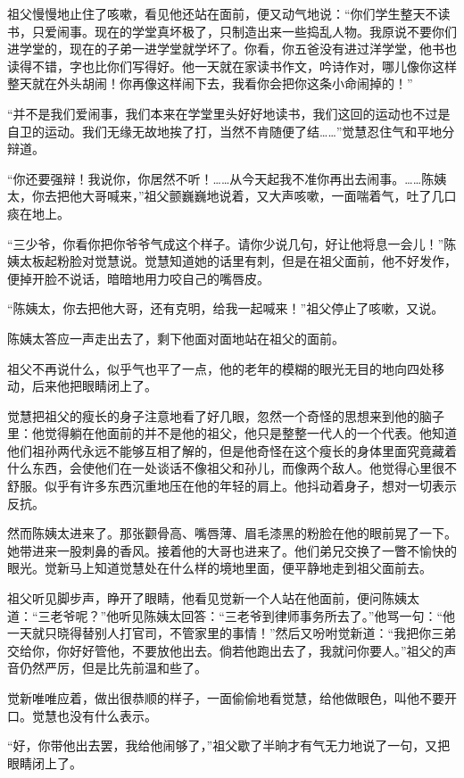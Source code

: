 \par 祖父慢慢地止住了咳嗽，看见他还站在面前，便又动气地说：“你们学生整天不读书，只爱闹事。现在的学堂真坏极了，只制造出来一些捣乱人物。我原说不要你们进学堂的，现在的子弟一进学堂就学坏了。你看，你五爸没有进过洋学堂，他书也读得不错，字也比你们写得好。他一天就在家读书作文，吟诗作对，哪儿像你这样整天就在外头胡闹！你再像这样闹下去，我看你会把你这条小命闹掉的！”
\par “并不是我们爱闹事，我们本来在学堂里头好好地读书，我们这回的运动也不过是自卫的运动。我们无缘无故地挨了打，当然不肯随便了结……”觉慧忍住气和平地分辩道。
\par “你还要强辩！我说你，你居然不听！……从今天起我不准你再出去闹事。……陈姨太，你去把他大哥喊来，”祖父颤巍巍地说着，又大声咳嗽，一面喘着气，吐了几口痰在地上。
\par “三少爷，你看你把你爷爷气成这个样子。请你少说几句，好让他将息一会儿！”陈姨太板起粉脸对觉慧说。觉慧知道她的话里有刺，但是在祖父面前，他不好发作，便掉开脸不说话，暗暗地用力咬自己的嘴唇皮。
\par “陈姨太，你去把他大哥，还有克明，给我一起喊来！”祖父停止了咳嗽，又说。
\par 陈姨太答应一声走出去了，剩下他面对面地站在祖父的面前。
\par 祖父不再说什么，似乎气也平了一点，他的老年的模糊的眼光无目的地向四处移动，后来他把眼睛闭上了。
\par 觉慧把祖父的瘦长的身子注意地看了好几眼，忽然一个奇怪的思想来到他的脑子里：他觉得躺在他面前的并不是他的祖父，他只是整整一代人的一个代表。他知道他们祖孙两代永远不能够互相了解的，但是他奇怪在这个瘦长的身体里面究竟藏着什么东西，会使他们在一处谈话不像祖父和孙儿，而像两个敌人。他觉得心里很不舒服。似乎有许多东西沉重地压在他的年轻的肩上。他抖动着身子，想对一切表示反抗。
\par 然而陈姨太进来了。那张颧骨高、嘴唇薄、眉毛漆黑的粉脸在他的眼前晃了一下。她带进来一股刺鼻的香风。接着他的大哥也进来了。他们弟兄交换了一瞥不愉快的眼光。觉新马上知道觉慧处在什么样的境地里面，便平静地走到祖父面前去。
\par 祖父听见脚步声，睁开了眼睛，他看见觉新一个人站在他面前，便问陈姨太道：“三老爷呢？”他听见陈姨太回答：“三老爷到律师事务所去了。”他骂一句：“他一天就只晓得替别人打官司，不管家里的事情！”然后又吩咐觉新道：“我把你三弟交给你，你好好管他，不要放他出去。倘若他跑出去了，我就问你要人。”祖父的声音仍然严厉，但是比先前温和些了。
\par 觉新唯唯应着，做出很恭顺的样子，一面偷偷地看觉慧，给他做眼色，叫他不要开口。觉慧也没有什么表示。
\par “好，你带他出去罢，我给他闹够了，”祖父歇了半晌才有气无力地说了一句，又把眼睛闭上了。
